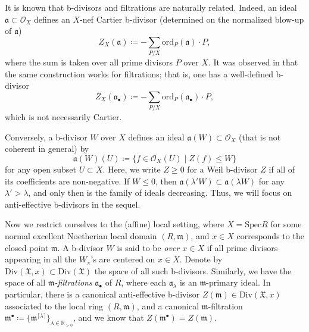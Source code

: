 \documentclass[11pt, leqno]{amsart}%
\theoremstyle{plain}
\theoremstyle{definition}
\theoremstyle{remark}
\newcommand{\cO}{\mathcal{O}}
\newcommand{\bR}{\mathbb{R}}
\newcommand{\bZ}{\mathbb{Z}}
\newcommand{\fX}{\mathfrak{X}}
\newcommand{\fa}{\mathfrak{a}}
\newcommand{\fm}{\mathfrak{m}}
\newcommand{\ord}{\mathrm{ord}}
\newcommand{\Spec}{\mathrm{Spec}}
\newcommand{\Div}{\mathrm{Div}}
\begin{document}
\medskip

It is known that b-divisors and filtrations are naturally related. Indeed, an ideal $\fa\subset \cO_X$ defines an $X$-nef Cartier b-divisor (determined on the normalized blow-up of $\fa$)
\[
    Z_X(\fa)\coloneqq -\sum_{P/X} \ord_P(\fa)\cdot P,
\]
where the sum is taken over all prime divisors $P$ over $X$. 
It was observed in \cite{BdFF-vol-iso} that the same construction works for filtrations; that is, one has a well-defined b-divisor
\begin{equation}\label{eqn:filtr to b-div}
    Z_X(\fa_\bullet)\coloneqq -\sum_{P/X} \ord_P(\fa_\bullet)\cdot P,
\end{equation}
which is not necessarily Cartier. 


Conversely, a b-divisor $W$ over $X$ defines an ideal $\fa(W)\subset\cO_X$ (that is not coherent in general) by
\begin{equation}\label{eqn:b-div to filtr}
    \fa(W)(U)\coloneqq \{f\in \cO_X(U)\mid Z(f)\le W\}
\end{equation}
for any open subset $U\subset X$. Here, we write $Z\ge 0$ for a Weil b-divisor $Z$ if all of its coefficients are non-negative. 
If $W\le 0$, then $\fa(\lambda' W)\subset \fa(\lambda W)$ for any $\lambda'>\lambda$, and only then is the family of ideals decreasing. 
Thus, we will focus on anti-effective b-divisors in the sequel.

\medskip

Now we restrict ourselves to the (affine) local setting, where $X=\Spec R$ for some normal excellent Noetherian local domain $(R,\fm)$, and $x\in X$ corresponds to the closed point $\fm$. 
A b-divisor $W$ is said to be \emph{over $x\in X$} if all prime divisors appearing in all the $W_\pi$'s are centered on $x\in X$. 
Denote by $\Div(\fX,x)\subset \Div(\fX)$ the space of all such b-divisors.
Similarly, we have the space of all \emph{$\fm$-filtrations} $\fa_\bullet$ of $R$, where each $\fa_\lambda$ is an $\fm$-primary ideal. 
In particular, there is a canonical anti-effective b-divisor $Z(\fm)\in\Div(\fX,x)$ associated to the local ring $(R,\fm)$, and a canonical $\fm$-filtration $\fm^\bullet\coloneqq\{\fm^{\lceil \lambda \rceil}\}_{\lambda\in\bR_{> 0}}$, and we know that $Z(\fm^\bullet)=Z(\fm)$.  
\end{document}
